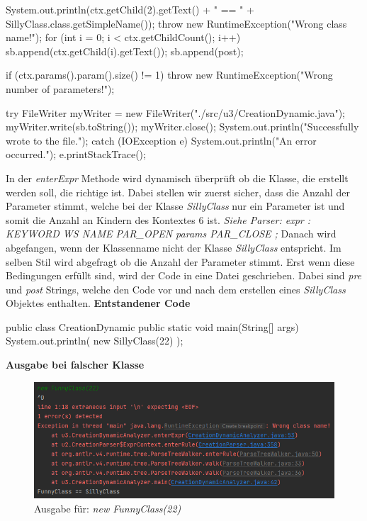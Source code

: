 \begin{code}[language=java, caption={ParserListener für dynamische Semantik}, label={lst:Aufgabe3b}]
{{{{                System.out.println(ctx.getChild(2).getText() + " == " + SillyClass.class.getSimpleName());
                throw new RuntimeException("Wrong class name!");
            }
            for (int i = 0; i < ctx.getChildCount(); i++) {
                sb.append(ctx.getChild(i).getText());
            }
            sb.append(post);

            if (ctx.params().param().size() != 1) {
                throw new RuntimeException("Wrong number of parameters!");
            }

            try {
                FileWriter myWriter = new FileWriter("./src/u3/CreationDynamic.java");
                myWriter.write(sb.toString());
                myWriter.close();
                System.out.println("Successfully wrote to the file.");
            } catch (IOException e) {
                System.out.println("An error occurred.");
                e.printStackTrace();
            }
        }
    }
}
\end{code}

In der \textit{enterExpr} Methode wird dynamisch überprüft ob die Klasse, die erstellt werden soll, die richtige ist.
Dabei stellen wir zuerst sicher, dass die Anzahl der Parameter stimmt, welche bei der Klasse \textit{SillyClass} nur ein Parameter ist
und somit die Anzahl an Kindern des Kontextes 6 ist.
\newline
\textit{Siehe Parser: expr : KEYWORD WS NAME PAR\_OPEN params PAR\_CLOSE ;}
\newline
Danach wird abgefangen, wenn der Klassenname nicht der Klasse \textit{SillyClass} entspricht.
Im selben Stil wird abgefragt ob die Anzahl der Parameter stimmt.
Erst wenn diese Bedingungen erfüllt sind, wird der Code in eine Datei geschrieben.
Dabei sind \textit{pre} und \textit{post} Strings, welche den Code vor und nach dem erstellen eines \textit{SillyClass} Objektes enthalten.
\newline
\newline
\textbf{Entstandener Code}
\begin{code}[language=java, caption={Erstellt für Input: \textit{new SillyClass(22)}}, label={lst:Aufgabe3b}]
public class CreationDynamic {
    public static void main(String[] args) {
        System.out.println(
			new SillyClass(22)
        );
    }
}
\end{code}
\newline
\textbf{Ausgabe bei falscher Klasse}
\begin{figure}[h]
    \includegraphics[width=\textwidth]{media/Aufgabe3b_wrong_output}
    \caption{Ausgabe für: \textit{new FunnyClass(22)}}
    \label{img:Aufgabe3b_output}
\end{figure}
